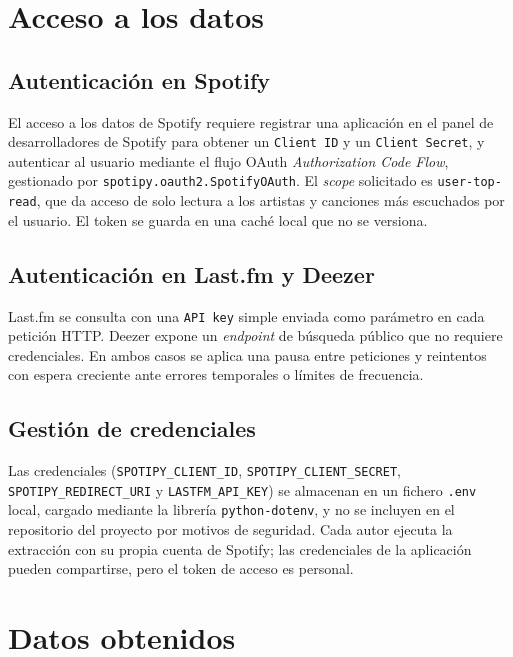 \section{Acceso a los datos}
\label{sec:acceso}

\subsection{Autenticación en Spotify}

El acceso a los datos de Spotify requiere registrar una aplicación en el panel de desarrolladores de Spotify para obtener un \texttt{Client ID} y un \texttt{Client Secret}, y autenticar al usuario mediante el flujo OAuth \emph{Authorization Code Flow}, gestionado por \nolinkurl{spotipy.oauth2.SpotifyOAuth}. El \emph{scope} solicitado es \texttt{user-top-read}, que da acceso de solo lectura a los artistas y canciones más escuchados por el usuario. El token se guarda en una caché local que no se versiona.

\subsection{Autenticación en Last.fm y Deezer}

Last.fm se consulta con una \texttt{API key} simple enviada como parámetro en cada petición HTTP. Deezer expone un \emph{endpoint} de búsqueda público que no requiere credenciales. En ambos casos se aplica una pausa entre peticiones y reintentos con espera creciente ante errores temporales o límites de frecuencia.

\subsection{Gestión de credenciales}

Las credenciales (\nolinkurl{SPOTIPY_CLIENT_ID}, \nolinkurl{SPOTIPY_CLIENT_SECRET}, \nolinkurl{SPOTIPY_REDIRECT_URI} y \nolinkurl{LASTFM_API_KEY}) se almacenan en un fichero \texttt{.env} local, cargado mediante la librería \texttt{python-dotenv}, y no se incluyen en el repositorio del proyecto por motivos de seguridad. Cada autor ejecuta la extracción con su propia cuenta de Spotify; las credenciales de la aplicación pueden compartirse, pero el token de acceso es personal.

\section{Datos obtenidos}
\label{sec:datos-obtenidos}

